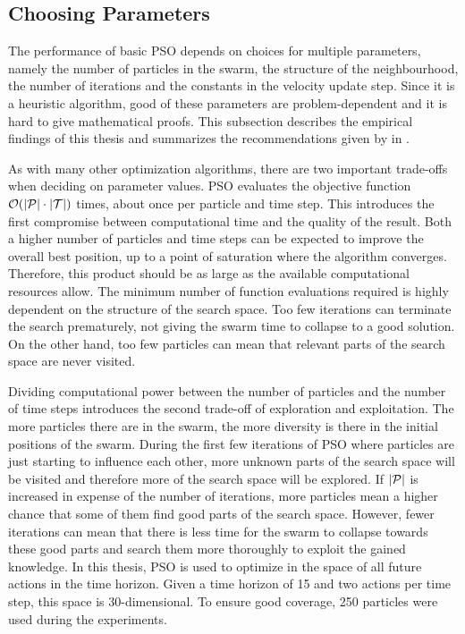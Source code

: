 \subsection{Choosing Parameters}
The performance of basic PSO depends on choices for multiple parameters, namely the number of particles in the swarm, the structure of the neighbourhood, the number of iterations and the constants in the velocity update step.
Since it is a heuristic algorithm, good of these parameters are problem-dependent and it is hard to give mathematical proofs.
This subsection describes the empirical findings of this thesis and summarizes the recommendations given by \citeauthor{engelbrecht_fundamentals_2006} in \cite{engelbrecht_fundamentals_2006}.

As with many other optimization algorithms, there are two important trade-offs when deciding on parameter values.
PSO evaluates the objective function $\Oh(\abs{\Pe} \cdot \abs{\Tee})$ times, about once per particle and time step.
This introduces the first compromise between computational time and the quality of the result.
Both a higher number of particles and time steps can be expected to improve the overall best position, up to a point of saturation where the algorithm converges.
Therefore, this product should be as large as the available computational resources allow.
The minimum number of function evaluations required is highly dependent on the structure of the search space.
Too few iterations can terminate the search prematurely, not giving the swarm time to collapse to a good solution.
On the other hand, too few particles can mean that relevant parts of the search space are never visited.

Dividing computational power between the number of particles and the number of time steps introduces the second trade-off of exploration and exploitation.
The more particles there are in the swarm, the more diversity is there in the initial positions of the swarm.
During the first few iterations of PSO where particles are just starting to influence each other, more unknown parts of the search space will be visited and therefore more of the search space will be explored.
If $\abs{\Pe}$ is increased in expense of the number of iterations, more particles mean a higher chance that some of them find good parts of the search space.
However, fewer iterations can mean that there is less time for the swarm to collapse towards these good parts and search them more thoroughly to exploit the gained knowledge.
In this thesis, PSO is used to optimize in the space of all future actions in the time horizon.
Given a time horizon of 15 and two actions per time step, this space is 30-dimensional.
To ensure good coverage, 250 particles were used during the experiments.

